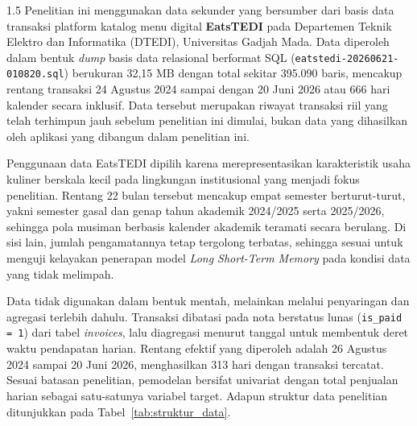 \documentclass[12pt, a4paper, onecolumn, oneside]{report}
\begin{document}
\begin{spacing}{1.5}
Penelitian ini menggunakan data sekunder yang bersumber dari basis data transaksi platform katalog menu digital \textbf{EatsTEDI} pada Departemen Teknik Elektro dan Informatika (DTEDI), Universitas Gadjah Mada. Data diperoleh dalam bentuk \textit{dump} basis data relasional berformat SQL (\texttt{eatstedi-20260621-010820.sql}) berukuran 32,15 MB dengan total sekitar 395.090 baris, mencakup rentang transaksi 24 Agustus 2024 sampai dengan 20 Juni 2026 atau 666 hari kalender secara inklusif. Data tersebut merupakan riwayat transaksi riil yang telah terhimpun jauh sebelum penelitian ini dimulai, bukan data yang dihasilkan oleh aplikasi yang dibangun dalam penelitian ini.

Penggunaan data EatsTEDI dipilih karena merepresentasikan karakteristik usaha kuliner berskala kecil pada lingkungan institusional yang menjadi fokus penelitian. Rentang 22 bulan tersebut mencakup empat semester berturut-turut, yakni semester gasal dan genap tahun akademik 2024/2025 serta 2025/2026, sehingga pola musiman berbasis kalender akademik teramati secara berulang. Di sisi lain, jumlah pengamatannya tetap tergolong terbatas, sehingga sesuai untuk menguji kelayakan penerapan model \textit{Long Short-Term Memory} pada kondisi data yang tidak melimpah.

Data tidak digunakan dalam bentuk mentah, melainkan melalui penyaringan dan agregasi terlebih dahulu. Transaksi dibatasi pada nota berstatus lunas (\texttt{is\_paid = 1}) dari tabel \textit{invoices}, lalu diagregasi menurut tanggal untuk membentuk deret waktu pendapatan harian. Rentang efektif yang diperoleh adalah 26 Agustus 2024 sampai 20 Juni 2026, menghasilkan 313 hari dengan transaksi tercatat. Sesuai batasan penelitian, pemodelan bersifat univariat dengan total penjualan harian sebagai satu-satunya variabel target. Adapun struktur data penelitian ditunjukkan pada Tabel~\ref{tab:struktur_data}.


\end{spacing}
\end{document}
